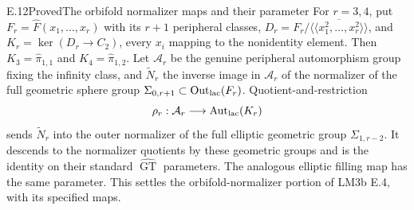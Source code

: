 \begin{result}{E.12}{Proved}{The orbifold normalizer maps and their parameter}
For $r=3,4$, put $F_r=\widehat F(x_1,\ldots,x_r)$ with its
$r+1$ peripheral classes, $D_r=F_r/\overline{\langle\!\langle
x_1^2,\ldots,x_r^2\rangle\!\rangle}$, and
$K_r=\ker(D_r\to C_2)$, every $x_i$ mapping to the
nonidentity element.  Then $K_3=\widehat\pi_{1,1}$ and
$K_4=\widehat\pi_{1,2}$.  Let $\mathcal A_r$ be the genuine
peripheral automorphism group fixing the infinity class, and
$\widetilde N_r$ the inverse image in $\mathcal A_r$ of the
normalizer of the full geometric sphere group
$\Sigma_{0,r+1}\subset\operatorname{Out}_{\rm lac}(F_r)$.
Quotient-and-restriction
\[
 \rho_r:\mathcal A_r\longrightarrow\operatorname{Aut}_{\rm lac}(K_r)
\]
sends $\widetilde N_r$ into the outer normalizer of the full
elliptic geometric group $\Sigma_{1,r-2}$.  It descends to the
normalizer quotients by these geometric groups and is the
identity on their standard $\widehat{\operatorname{GT}}$
parameters.  The analogous elliptic filling map has the same
parameter.  This settles the orbifold-normalizer portion of
LM3b E.4, with its specified maps.
\end{result}
